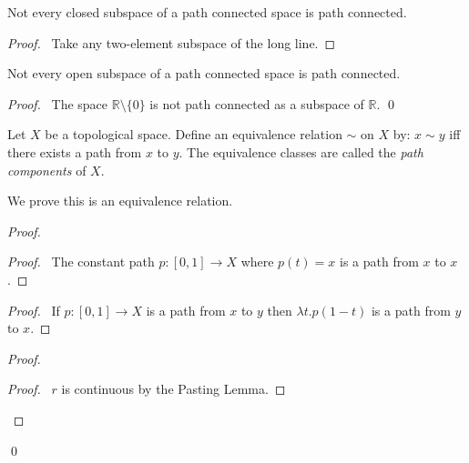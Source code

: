 \begin{cor}
Not every closed subspace of a path connected space is path connected.
\end{cor}

\begin{proof}
\pf\ Take any two-element subspace of the long line.
\end{proof}

\begin{cor}
Not every open subspace of a path connected space is path connected.
\end{cor}

\begin{proof}
\pf\ The space $\mathbb{R} \setminus \{ 0 \}$ is not path connected as a subspace of $\mathbb{R}$. \qed
\end{proof}

\begin{df}
  Let $X$ be a topological space. Define an equivalence relation $\sim$ on
  $X$
  by: $x \sim y$ iff there exists a path from $x$ to $y$. The equivalence
  classes  are called the \emph{path components} of $X$.

  We prove this is an equivalence relation.
\end{df}

\begin{proof}
  \pf
  \begin{proof}
    \pf\ The constant path $p : [0,1] \rightarrow X$ where $p(t) = x$ is a
    path from $x$ to $x$.
  \end{proof}
  \begin{proof}
    \pf\ If $p : [0,1] \rightarrow X$ is a path from $x$ to $y$ then $\lambda
    t. p(1-t)$ is a path from $y$ to $x$.
  \end{proof}
  \begin{proof}
    \begin{proof}
      \pf\ $r$ is continuous by the Pasting Lemma.
    \end{proof}
  \end{proof}
  \qed
\end{proof}

